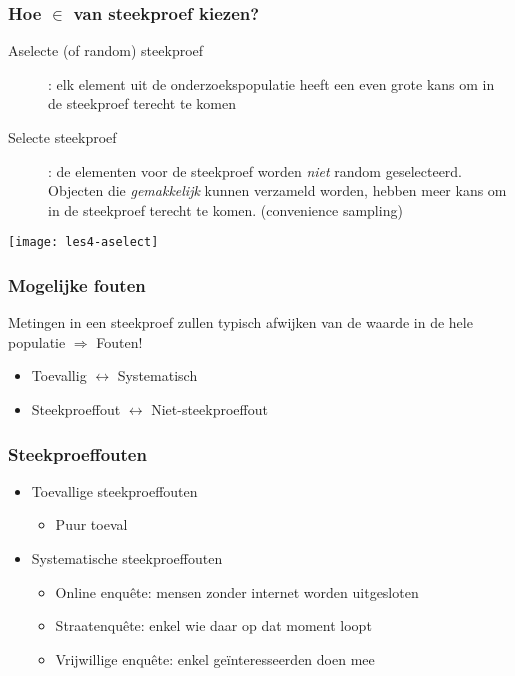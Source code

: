 \documentclass[aspectratio=169]{beamer}
\begin{document}
\begin{frame}
  \frametitle{Hoe $\in$ van steekproef kiezen?}
  
  \begin{description}
    \item[Aselecte (of random) steekproef]: elk element uit de onderzoekspopulatie heeft een even grote kans om in de steekproef terecht te komen
    \item[Selecte steekproef]: de elementen voor de steekproef worden \textit{niet} random geselecteerd.
    Objecten die \textit{gemakkelijk} kunnen verzameld worden, hebben meer kans om in de steekproef terecht te komen.
    (convenience sampling)
  \end{description}
  
  \begin{center}
    \texttt{[image: les4-aselect]}
  \end{center}
\end{frame}

\begin{frame}
  \frametitle{Mogelijke fouten}
  
  Metingen in een steekproef zullen typisch afwijken van de waarde in de hele populatie $\Rightarrow$ Fouten!
  
  \bigskip
  
  \begin{itemize}
    \item Toevallig $\leftrightarrow$ Systematisch
    \item Steekproeffout $\leftrightarrow$ Niet-steekproeffout
  \end{itemize}
\end{frame}

\begin{frame}
  \frametitle{Steekproeffouten}
  
  \begin{itemize}
    \item<+-> Toevallige steekproeffouten
    \begin{itemize}
      \item Puur toeval
    \end{itemize}
    \item<+-> Systematische steekproeffouten
    \begin{itemize}
      \item Online enquête: mensen zonder internet worden uitgesloten
      \item Straatenquête: enkel wie daar op dat moment loopt
      \item Vrijwillige enquête: enkel geïnteresseerden doen mee
    \end{itemize}
  \end{itemize}
\end{frame}
\end{document}
